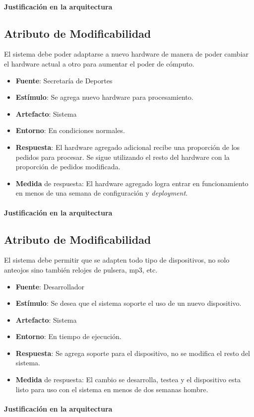 \paragraph{Justificación en la arquitectura}


\subsection{Atributo de Modificabilidad}
El sistema debe poder adaptarse a nuevo hardware de manera de poder cambiar el hardware actual a otro para aumentar el poder de cómputo.

\begin{itemize}
  \item \textbf{Fuente}: Secretaría de Deportes
  \item \textbf{Estímulo}: Se agrega nuevo hardware para procesamiento.
  \item \textbf{Artefacto}: Sistema
  \item \textbf{Entorno}: En condiciones normales.
  \item \textbf{Respuesta}: El hardware agregado adicional recibe una proporción de los pedidos para procesar. Se sigue utilizando el resto del hardware con la proporción de pedidos modificada.
  \item \textbf{Medida} de respuesta: El hardware agregado logra entrar en funcionamiento en menos de una semana de configuración y \emph{deployment}.
\end{itemize}

\paragraph{Justificación en la arquitectura}


\subsection{Atributo de Modificabilidad}
El sistema debe permitir que se adapten todo tipo de dispositivos, no solo anteojos sino también relojes de pulsera, mp3, etc.

\begin{itemize}
  \item \textbf{Fuente}: Desarrollador
  \item \textbf{Estímulo}: Se desea que el sistema soporte el uso de un nuevo dispositivo.
  \item \textbf{Artefacto}: Sistema
  \item \textbf{Entorno}: En tiempo de ejecución.
  \item \textbf{Respuesta}: Se agrega soporte para el dispositivo, no se modifica el resto del sistema.
  \item \textbf{Medida} de respuesta: El cambio se desarrolla, testea y el dispositivo esta listo para uso con el sistema en menos de dos semanas hombre.
\end{itemize}

\paragraph{Justificación en la arquitectura}

